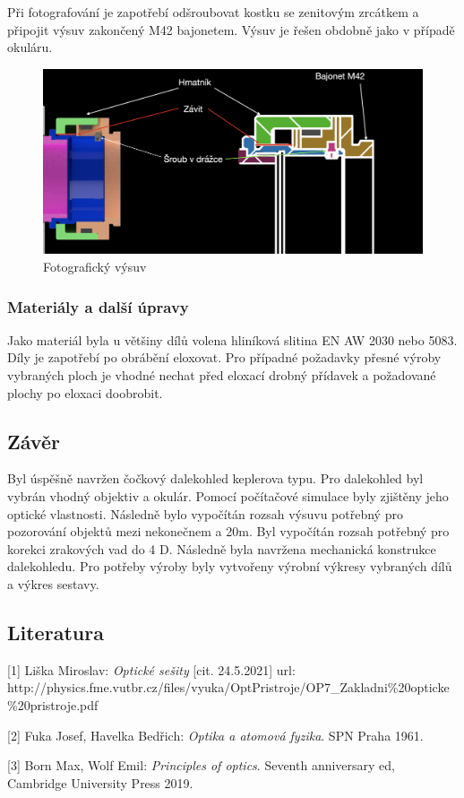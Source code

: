 \documentclass[
]{article}
\begin{document}
Při fotografování je zapotřebí odšroubovat kostku se zenitovým zrcátkem
a připojit výsuv zakončený M42 bajonetem. Výsuv je řešen obdobně jako v
případě okuláru.

\begin{figure}
\centering
\includegraphics{imgs/vysuv_foto.png}
\caption{Fotografický výsuv}
\end{figure}

\hypertarget{materiuxe1ly-a-dalux161uxed-uxfapravy}{%
\subsubsection{Materiály a další
úpravy}\label{materiuxe1ly-a-dalux161uxed-uxfapravy}}

Jako materiál byla u většiny dílů volena hliníková slitina EN AW 2030
nebo 5083. Díly je zapotřebí po obrábění eloxovat. Pro případné
požadavky přesné výroby vybraných ploch je vhodné nechat před eloxací
drobný přídavek a požadované plochy po eloxaci doobrobit.

\hypertarget{zuxe1vux11br}{%
\subsection{Závěr}\label{zuxe1vux11br}}

Byl úspěšně navržen čočkový dalekohled keplerova typu. Pro dalekohled
byl vybrán vhodný objektiv a okulár. Pomocí počítačové simulace byly
zjištěny jeho optické vlastnosti. Následně bylo vypočítán rozsah výsuvu
potřebný pro pozorování objektů mezi nekonečnem a 20m. Byl vypočítán
rozsah potřebný pro korekci zrakových vad do 4 D. Následně byla navržena
mechanická konstrukce dalekohledu. Pro potřeby výroby byly vytvořeny
výrobní výkresy vybraných dílů a výkres sestavy.

\hypertarget{literatura}{%
\subsection{\texorpdfstring{Literatura
}{Literatura }}\label{literatura}}

{[}1{]} Liška Miroslav: \emph{Optické sešity} {[}cit. 24.5.2021{]} url:
http://physics.fme.vutbr.cz/files/vyuka/OptPristroje/OP7\_Zakladni\%20opticke\%20pristroje.pdf

{[}2{]} Fuka Josef, Havelka Bedřich: \emph{Optika a atomová fyzika}. SPN
Praha 1961.

{[}3{]} Born Max, Wolf Emil: \emph{Principles of optics}. Seventh
anniversary ed, Cambridge University Press 2019.
\end{document}
